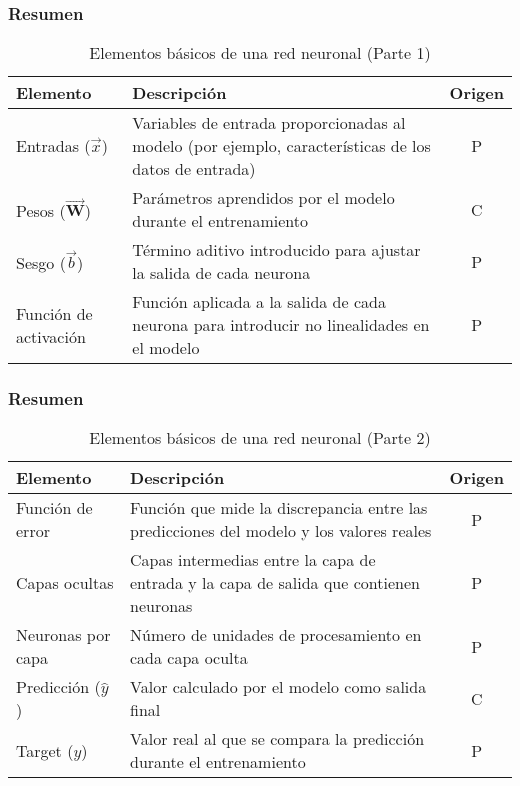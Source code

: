 \begin{frame}
	\frametitle{Resumen}
	
	\begin{table}[h]
		\centering
		\begin{tabular}{|l|p{6cm}|c|}
			\hline
			Elemento & Descripción & Origen \\ \hline
			Entradas ($\vec{x}$) & Variables de entrada proporcionadas al modelo (por ejemplo, características de los datos de entrada) & P \\ \hline
			Pesos ($\vec{\mathbf{W}}$) & Parámetros aprendidos por el modelo durante el entrenamiento & C \\ \hline
			Sesgo ($\vec{b}$) & Término aditivo introducido para ajustar la salida de cada neurona & P \\ \hline
			Función de activación & Función aplicada a la salida de cada neurona para introducir no linealidades en el modelo & P \\ \hline
		\end{tabular}
		\caption{Elementos básicos de una red neuronal (Parte 1)}
		\label{table:elementos_red_neuronal1}
	\end{table}
	
\end{frame}

\begin{frame}
	\frametitle{Resumen}
	
	\begin{table}[h]
		\centering
		\begin{tabular}{|l|p{6.5cm}|c|}
			\hline
			Elemento & Descripción & Origen \\ \hline
			Función de error & Función que mide la discrepancia entre las predicciones del modelo y los valores reales & P \\ \hline
			Capas ocultas & Capas intermedias entre la capa de entrada y la capa de salida que contienen neuronas & P \\ \hline
			Neuronas por capa & Número de unidades de procesamiento en cada capa oculta & P \\ \hline
			Predicción ($\hat{y}$) & Valor calculado por el modelo como salida final & C \\ \hline
			Target ($y$) & Valor real al que se compara la predicción durante el entrenamiento & P \\ \hline
		\end{tabular}
		\caption{Elementos básicos de una red neuronal (Parte 2)}
		\label{table:elementos_red_neuronal2}
	\end{table}
\end{frame}

